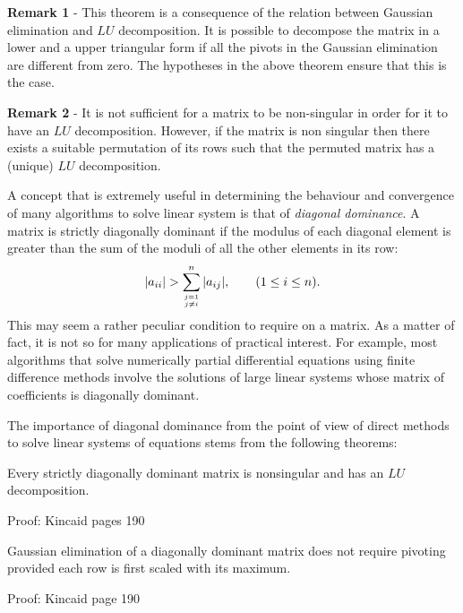 \noindent
\textbf{Remark 1} - This theorem is a consequence of the relation
between Gaussian elimination and $LU$ decomposition.   It is possible to
decompose the matrix in a lower and a upper triangular form if all the
pivots in the Gaussian elimination are different from zero.   The
hypotheses in the above theorem ensure that this is the case.

\smallskip

\noindent
\textbf{Remark 2} - It is not sufficient for a matrix to be
non-singular in order for it to have an $LU$ decomposition.  However, if
the matrix is non singular then there exists a suitable permutation of
its rows such that the permuted matrix has a (unique)
$LU$ decomposition.

A concept that is extremely useful in determining the behaviour and
convergence of many algorithms to solve linear system is that of
\textit{diagonal dominance}.   A matrix is strictly diagonally dominant if the
modulus of each diagonal element is greater than the sum of the moduli
of all the other elements in its row:
%
\begin{equation*}
  | a_{i i} | > \sum_{\genfrac{}{}{0pt}{}{j=1}{j \ne i}}^n
  | a_{i j} |, \qquad (1 \le i \le n) .
\end{equation*}
%
This may seem a rather peculiar condition to require on a matrix.   As
a matter of fact, it is not so for many applications of practical
interest.   For example, most algorithms that solve numerically
partial differential equations using finite difference methods involve
the solutions of large linear systems whose matrix of coefficients is
diagonally dominant.

The importance of diagonal dominance from the point of view of
direct methods to solve linear systems of equations stems from the
following theorems:

\begin{theorem}
\label{diagdom1}
Every strictly diagonally dominant matrix is nonsingular and has an
$LU$ decomposition.
\end{theorem}

\noindent Proof: Kincaid pages 190

\begin{theorem}
\label{diagdom2}
Gaussian elimination of a diagonally dominant matrix does not require
pivoting provided each row is first scaled with its maximum.
\end{theorem}

\noindent Proof: Kincaid page 190

